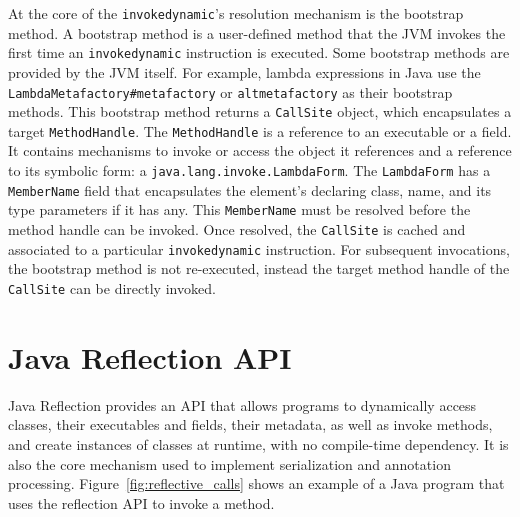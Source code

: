 At the core of the \verb|invokedynamic|'s resolution mechanism is the bootstrap method. A bootstrap method is a user-defined method that the JVM invokes the first time an \verb|invokedynamic| instruction is executed. Some bootstrap methods are provided by the JVM itself. For example, lambda expressions in Java use the \verb|LambdaMetafactory#metafactory| or \verb|altmetafactory| as their bootstrap methods.
This bootstrap method returns a \verb|CallSite| object, which encapsulates a target \verb|MethodHandle|. The \verb|MethodHandle| is a reference to an executable or a field. 
It contains mechanisms to invoke or access the object it references and a reference to its symbolic form: a \verb|java.lang.invoke.LambdaForm|. The \verb|LambdaForm| has a \verb|MemberName| field that encapsulates the element's declaring class, name, and its type parameters if it has any. This \verb|MemberName| must be resolved before the method handle can be invoked. 
Once resolved, the \verb|CallSite| is cached and associated to a particular \verb|invokedynamic| instruction.
For subsequent invocations, the bootstrap method is not re-executed, instead the target method handle of the \verb|CallSite| can be directly invoked.
\section{Java Reflection API}
Java Reflection provides an API that allows programs to dynamically access classes, their executables and fields, their metadata, as well as invoke methods, and create instances of classes at runtime, with no compile-time dependency. It is also the core mechanism used to implement serialization and annotation processing. Figure~\ref{fig:reflective_calls} shows an example of a Java program that uses the reflection API to invoke a method.

